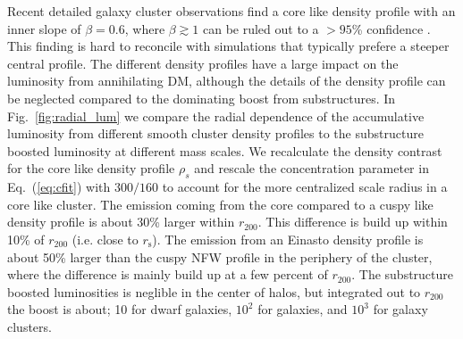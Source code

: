 \documentclass[10pt,aps,pra,reprint,amsmath,amsfonts,amssymb,showpacs]{revtex4-1}
\newcommand{\rmn}{\mathrm}
\newcommand{\rhos}{\ensuremath{\rho_s}}
\newcommand{\rvir}{r_{200}}
\begin{document}
Recent detailed galaxy cluster observations find a core like density
profile with an inner slope of $\beta=0.6$, where $\beta\gtrsim 1$ can
be ruled out to a $>95$\% confidence \cite{2011ApJ...728L..39N}. This
finding is hard to reconcile with simulations that typically prefere a
steeper central profile. The different density profiles have a large
impact on the luminosity from annihilating DM, although the details of
the density profile can be neglected compared to the dominating boost
from substructures. In Fig.~\ref{fig:radial_lum} we compare the radial
dependence of the accumulative luminosity from different smooth
cluster density profiles to the substructure boosted luminosity at
different mass scales. We recalculate the density contrast for the
core like density profile $\rhos$ and rescale the concentration
parameter in Eq.~(\ref{eq:cfit}) with $300/160$
\cite{2011ApJ...728L..39N} to account for the more centralized scale
radius in a core like cluster. The emission coming from the core
compared to a cuspy like density profile is about 30\% larger within
$\rvir$. This difference is build up within 10\% of $\rvir$
(i.e. close to $r_\rmn{s}$). The emission from an Einasto density
profile is about 50\% larger than the cuspy NFW profile in the
periphery of the cluster, where the difference is mainly build up at a
few percent of $\rvir$. The substructure boosted luminosities is
neglible in the center of halos, but integrated out to $\rvir$ the
boost is about; 10 for dwarf galaxies, $10^2$ for galaxies, and $10^3$
for galaxy clusters.
\end{document}
